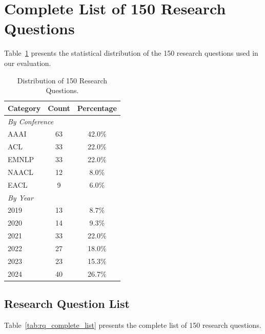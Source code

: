 

\section{Complete List of 150 Research Questions}
\label{app:rq_list}

Table~\ref{tab:rq_statistics} presents the statistical distribution of the 150 research questions used in our evaluation.

\begin{table}[h]
\centering
\small
\caption{Distribution of 150 Research Questions.}
\label{tab:rq_statistics}
\begin{tabular}{lcc}
\toprule
\textbf{Category} & \textbf{Count} & \textbf{Percentage} \\
\midrule
\multicolumn{3}{l}{\textit{By Conference}} \\
AAAI & 63 & 42.0\% \\
ACL & 33 & 22.0\% \\
EMNLP & 33 & 22.0\% \\
NAACL & 12 & 8.0\% \\
EACL & 9 & 6.0\% \\
\midrule
\multicolumn{3}{l}{\textit{By Year}} \\
2019 & 13 & 8.7\% \\
2020 & 14 & 9.3\% \\
2021 & 33 & 22.0\% \\
2022 & 27 & 18.0\% \\
2023 & 23 & 15.3\% \\
2024 & 40 & 26.7\% \\
\bottomrule
\end{tabular}
\end{table}

\subsection{Research Question List}

Table~\ref{tab:rq_complete_list} presents the complete list of 150 research questions.

